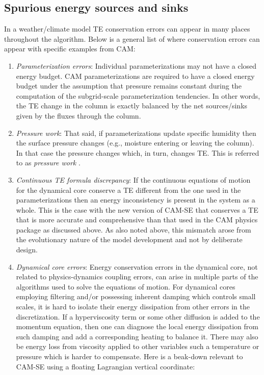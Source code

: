 \documentclass{agujournal}
\begin{document}
\subsection{Spurious energy sources and sinks}\label{subsec:spuriousE}
In a weather/climate model TE conservation errors can appear in many places throughout the algorithm. Below is a general list of where conservation errors can appear with specific examples from CAM:
\begin{enumerate}
\item {\em{Parameterization errors}}: Individual parameterizations may not have a closed energy budget. CAM parameterizations are required to have a closed energy budget under the assumption that pressure remains constant during the computation of the subgrid-scale parameterization tendencies. In other words, the TE change in the column is exactly balanced by the net sources/sinks given by the fluxes through the column. 
\item {\em{Pressure work}}: That said, if parameterizations update specific humidity then the surface pressure changes (e.g., moisture entering or leaving the column). In that case the pressure changes which, in turn, changes TE. This is referred to as {\em{pressure work}} \citep[section 3.1.8 in ][]{CAM5}.
\item {\em{Continuous TE formula discrepancy}}:  If the continuous equations of motion for the dynamical core conserve a TE different from the one used in the parameterizations then an energy inconsistency is present in the system as a whole. This is the case with the new version of CAM-SE that conserves a TE that is more accurate and comprehensive than that used in the CAM physics package as discussed above. As also noted above, this mismatch arose from the evolutionary nature of the model development and not by deliberate design.
\item {\em{Dynamical core errors}}: Energy conservation errors in the dynamical core, not related to physics-dynamics coupling errors, can arise in multiple parts of the algorithms used to solve the equations of motion. For dynamical cores employing filtering \citep[e.g., limiters in flux operators ][]{L2004MWR} and/or possessing inherent damping which controls small scales, it is hard to isolate their energy dissipation from other errors in the discretization. If a hyperviscosity term or some other diffusion is added to the momentum equation, then one can diagnose the local energy dissipation from such damping and add a corresponding heating to balance it. There may also be energy loss from viscosity applied to other variables such a temperature or pressure which is harder to compensate. Here is a beak-down relevant to CAM-SE using a floating Lagrangian vertical coordinate:

\end{enumerate}
\end{document}
